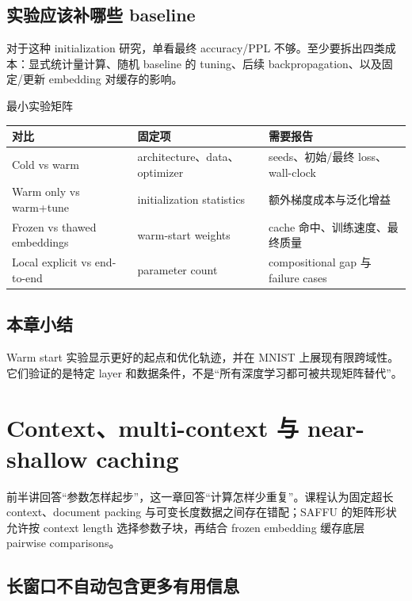 \documentclass[a4paper]{article}
\begin{document}

\subsection{实验应该补哪些 baseline}

对于这种 initialization 研究，单看最终 accuracy/PPL 不够。至少要拆出四类成本：显式统计量计算、随机 baseline 的 tuning、后续 backpropagation、以及固定/更新 embedding 对缓存的影响。

\begin{knowledgebox}{最小实验矩阵}
\begin{tabularx}{\textwidth}{L{0.18\textwidth} L{0.24\textwidth} X}
\toprule
对比 & 固定项 & 需要报告 \\
\midrule
Cold vs warm & architecture、data、optimizer & seeds、初始/最终 loss、wall-clock \\
Warm only vs warm+tune & initialization statistics & 额外梯度成本与泛化增益 \\
Frozen vs thawed embeddings & warm-start weights & cache 命中、训练速度、最终质量 \\
Local explicit vs end-to-end & parameter count & compositional gap 与 failure cases \\
\bottomrule
\end{tabularx}
\end{knowledgebox}

\subsection{本章小结}

Warm start 实验显示更好的起点和优化轨迹，并在 MNIST 上展现有限跨域性。它们验证的是特定 layer 和数据条件，不是“所有深度学习都可被共现矩阵替代”。

\section{Context、multi-context 与 near-shallow caching}

前半讲回答“参数怎样起步”，这一章回答“计算怎样少重复”。课程认为固定超长 context、document packing 与可变长度数据之间存在错配；SAFFU 的矩阵形状允许按 context length 选择参数子块，再结合 frozen embedding 缓存底层 pairwise comparisons。

\subsection{长窗口不自动包含更多有用信息}
\end{document}

